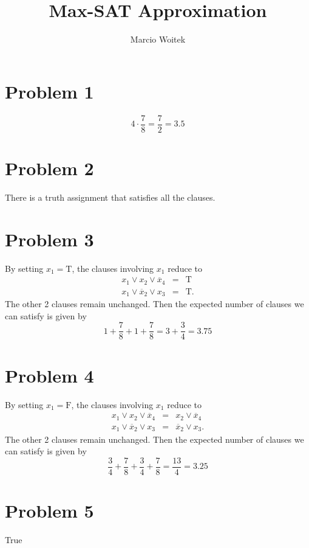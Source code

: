 \documentclass[11pt]{article}
\author{Marcio Woitek}
\date{}
\title{Max-SAT Approximation}
\begin{document}
\maketitle
\thispagestyle{empty}

\section*{Problem 1}
\label{sec:orgc587beb}
\begin{equation}
4 \cdot \frac{7}{8} = \frac{7}{2} = 3.5
\end{equation}

\section*{Problem 2}
\label{sec:org7898f1e}
There is a truth assignment that satisfies all the clauses.

\section*{Problem 3}
\label{sec:orge1dd712}
By setting \(x_1 = \mathrm{T}\), the clauses involving \(x_1\) reduce to
\begin{eqnarray*}
x_1 \vee x_2 \vee \overline{x}_4 &=& \mathrm{T} \\
x_1 \vee \overline{x}_2 \vee x_3 &=& \mathrm{T}.
\end{eqnarray*}
The other 2 clauses remain unchanged. Then the expected number of clauses we can
satisfy is given by
\begin{equation}
1 + \frac{7}{8} + 1 + \frac{7}{8} = 3 + \frac{3}{4} = 3.75
\end{equation}

\section*{Problem 4}
\label{sec:org35489a5}
By setting \(x_1 = \mathrm{F}\), the clauses involving \(x_1\) reduce to
\begin{eqnarray*}
x_1 \vee x_2 \vee \overline{x}_4 &=& x_2 \vee \overline{x}_4 \\
x_1 \vee \overline{x}_2 \vee x_3 &=& \overline{x}_2 \vee x_3.
\end{eqnarray*}
The other 2 clauses remain unchanged. Then the expected number of clauses we can
satisfy is given by
\begin{equation}
\frac{3}{4} + \frac{7}{8} + \frac{3}{4} + \frac{7}{8} = \frac{13}{4} = 3.25
\end{equation}

\section*{Problem 5}
\label{sec:orgf4b347e}
True
\end{document}
